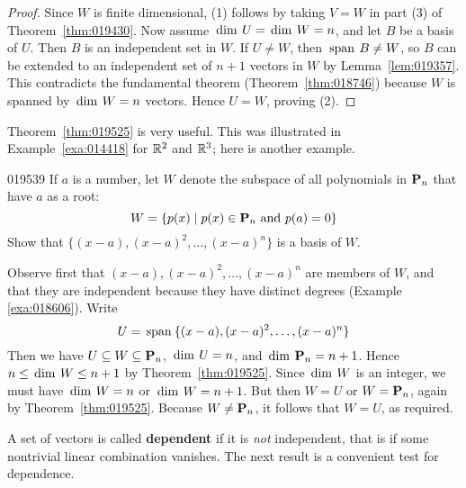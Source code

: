 \begin{proof}
Since $W$ is finite dimensional, (1) follows by taking $V = W$ in part (3) of Theorem~\ref{thm:019430}. Now assume $\thinspace\operatorname{dim\medspace} U = \thinspace\operatorname{dim\medspace} W = n$, and let $B$ be a basis of $U$. Then $B$ is an independent set in $W$. If $U \neq W$, then $\thinspace\operatorname{span\medspace} B \neq W$, so $B$ can be extended to an independent set of $n + 1$ vectors in $W$ by Lemma~\ref{lem:019357}. This contradicts the fundamental theorem (Theorem~\ref{thm:018746}) because $W$ is spanned by $\thinspace\operatorname{dim\medspace} W = n$ vectors. Hence $U = W$, proving (2).
\end{proof}

Theorem~\ref{thm:019525} is very useful. This was illustrated in Example~\ref{exa:014418} for $\mathbb{R}^2$ and $\mathbb{R}^3$; here is another example.

\begin{example}{}{019539}
If $a$ is a number, let $W$ denote the subspace of all polynomials in $\textbf{P}_{n}$ that have $a$ as a root:
\begin{equation*}
W = \{p(x) \mid p(x) \in \textbf{P}_n \mbox{ and } p(a) = 0 \}
\end{equation*}
Show that $\{(x - a), (x - a)^{2}, \dots, (x - a)^{n}\}$ is a basis of $W$.

\begin{solution}
Observe first that $(x - a), (x - a)^2, \dots, (x - a)^n$ are members of $W$, and that they are independent because they have distinct degrees (Example \ref{exa:018606}). Write
\begin{equation*}
U = \thinspace\operatorname{span\medspace}\{(x - a), (x - a)^2, \dots, (x - a)^n \}
\end{equation*}
Then we have $U \subseteq W \subseteq \textbf{P}_{n}$, $\thinspace\operatorname{dim\medspace} U = n$, and $\thinspace\operatorname{dim\medspace} \textbf{P}_{n} = n + 1$. Hence $n \leq \thinspace\operatorname{dim\medspace} W \leq n + 1$ by Theorem~\ref{thm:019525}. Since $\thinspace\operatorname{dim\medspace} W$ is an integer, we must have $\thinspace\operatorname{dim\medspace} W = n$ or $\thinspace\operatorname{dim\medspace} W = n + 1$. But then $W = U$ or $W = \textbf{P}_{n}$, again by Theorem~\ref{thm:019525}. Because $W \neq \textbf{P}_{n}$, it follows that $W = U$, as required.
\end{solution}
\end{example}

A set of vectors is called \textbf{dependent} if it is \textit{not} independent, that is if some nontrivial linear combination vanishes. The next result is a convenient test for dependence.

